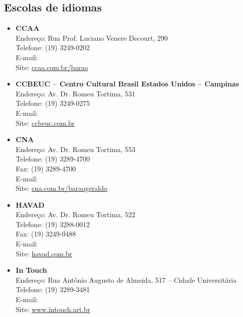 \subsection{Escolas de idiomas}

\begin{itemize}
    \item   \textbf{CCAA}
        \\Endereço: Rua Prof. Luciano Venere Decourt, 290
        \\Telefone: (19) 3249-0202
        \\E-mail: 
        \\Site: \url{ccaa.com.br/barao}

    \item   \textbf{CCBEUC -- Centro Cultural Brasil Estados Unidos -- Campinas}
        \\Endereço: Av. Dr. Romeu Tortima, 531
        \\Telefone: (19) 3249-0275
        \\E-mail: 
        \\Site: \url{ccbeuc.com.br}

    \item   \textbf{CNA}
        \\Endereço: Av. Dr. Romeu Tortima, 553
        \\Telefone: (19) 3289-4700
        \\Fax: (19) 3289-4700
        \\E-mail: 
        \\Site: \url{cna.com.br/baraogeraldo}

    \item   \textbf{HAVAD}
        \\Endereço: Av. Dr. Romeu Tortima, 522
        \\Telefone: (19) 3288-0012
        \\Fax: (19) 3249-0488
        \\E-mail: 
        \\Site: \url{havad.com.br}

    \item   \textbf{In Touch}
        \\Endereço: Rua Antônio Augusto de Almeida, 517 -- Cidade Universitária
        \\Telefone: (19) 3289-3481
        \\E-mail: 
        \\Site: \url{www.intouch.art.br}


\end{itemize}
